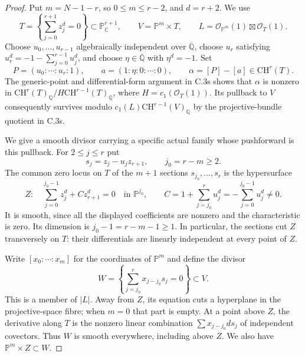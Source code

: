 \begin{proof}
Put $m=N-1-r$, so $0\le m\le r-2$, and $d=r+2$. We use
\[
 T=\left\{\sum_{j=0}^{r+1}z_j^d=0\right\}
          \subset\mathbb P^{r+1}_{\mathbb C},\qquad
 V=\mathbb P^m\times T,\qquad
 L=\mathcal O_{\mathbb P^m}(1)\boxtimes\mathcal O_T(1).
\]
Choose $u_0,\ldots,u_{r-1}$ algebraically independent over
$\overline{\mathbb Q}$, choose $u_r$ satisfying
$u_r^d=-1-\sum_{j=0}^{r-1}u_j^d$, and choose
$\eta\in\overline{\mathbb Q}$ with $\eta^d=-1$. Set
\[
       P=(u_0:\cdots:u_r:1),\qquad
       a=(1:\eta:0:\cdots:0),\qquad
       \alpha=[P]-[a]\in\mathrm{CH}^r(T).
\]
The generic-point and differential-form argument in C.3s shows that
$\alpha$ is nonzero in
$\mathrm{CH}^r(T)_{\mathbb Q}/H\mathrm{CH}^{r-1}(T)_{\mathbb Q}$,
where $H=c_1(\mathcal O_T(1))$. Its pullback to $V$ consequently
survives modulo $c_1(L)\mathrm{CH}^{r-1}(V)_{\mathbb Q}$ by the
projective-bundle quotient in C.3s.

We give a smooth divisor carrying a specific actual family whose
pushforward is this pullback. For $2\le j\le r$ put
\[
                       s_j=z_j-u_jz_{r+1},\qquad j_0=r-m\ge2.
\]
The common zero locus on $T$ of the $m+1$ sections
$s_{j_0},\ldots,s_r$ is the hypersurface
\[
 Z:\quad \sum_{j=0}^{j_0-1}z_j^d+Cz_{r+1}^d=0
                 \quad\text{in }\mathbb P^{j_0},\qquad
 C=1+\sum_{j=j_0}^{r}u_j^d
        =-\sum_{j=0}^{j_0-1}u_j^d\ne0.
\]
It is smooth, since all the displayed coefficients are nonzero
and the characteristic is zero. Its dimension is
$j_0-1=r-m-1\ge1$. In particular, the sections cut $Z$ transversely
on $T$: their differentials are linearly independent at every point
of $Z$.

Write $[x_0:\cdots:x_m]$ for the coordinates of $\mathbb P^m$ and
define the divisor
\begin{equation}\label{eq:C3-uniform-incidence-divisor}
       W=\left\{\sum_{j=j_0}^{r}x_{j-j_0}s_j=0\right\}\subset V.
\end{equation}
This is a member of $|L|$. Away from $Z$, its equation cuts a
hyperplane in the projective-space fibre; when $m=0$ that part is
empty. At a point above $Z$, the derivative along $T$ is the
nonzero linear combination $\sum x_{j-j_0}ds_j$ of independent
covectors. Thus $W$ is smooth everywhere, including above $Z$.
We also have $\mathbb P^m\times Z\subset W$.


\end{proof}

